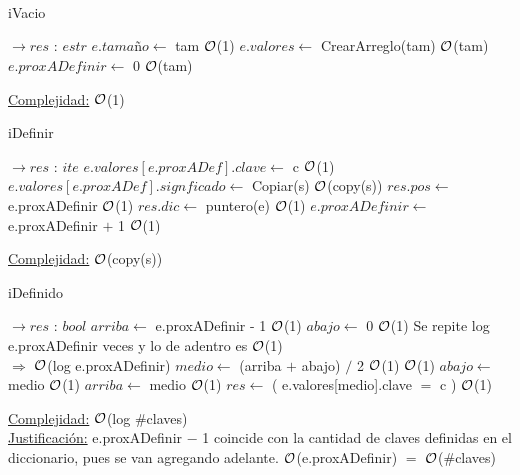 \begin{Representacion}
~

	
~

		
~

	\begin{algorithm}[H]
		\caption{iVacio}
		\begin{algorithmic}
			 $\to res$ : $estr$
				\State $e.tamaño \gets$ tam \Comment $\mathcal{O}$(1)
				\State $e.valores \gets$ CrearArreglo(tam) \Comment $\mathcal{O}$(tam)
				\State $e.proxADefinir \gets$ 0 \Comment $\mathcal{O}$(tam)				
			\EndProcedure
		\end{algorithmic}
		\underline{Complejidad:} $\mathcal{O}$(1)
	\end{algorithm}
	
	\begin{algorithm}[H]
		\caption{iDefinir}
		\begin{algorithmic}
			 $\to res$ : $ite$
				\State $e.valores[e.proxADef].clave \gets$ c \Comment $\mathcal{O}$(1)
				\State $e.valores[e.proxADef].signficado \gets$ Copiar(s) \Comment $\mathcal{O}$(copy(s))
				\State $res.pos \gets$ e.proxADefinir \Comment $\mathcal{O}$(1)
				\State $res.dic \gets$ puntero(e) \Comment $\mathcal{O}$(1)
				\State $e.proxADefinir \gets$ e.proxADefinir $+$ 1 \Comment $\mathcal{O}$(1)
			\EndProcedure
		\end{algorithmic}
		\underline{Complejidad:} $\mathcal{O}$(copy(s))
	\end{algorithm}
	
	\begin{algorithm}[H]
		\caption{iDefinido}
		\begin{algorithmic}
			 $\to res$ : $bool$
				\State $arriba \gets$ e.proxADefinir - 1 \Comment $\mathcal{O}$(1)
				\State $abajo \gets$ 0 \Comment $\mathcal{O}$(1)
				 \Comment Se repite log e.proxADefinir veces y lo de adentro es $\mathcal{O}$(1)\\
				 \hfill $\Rightarrow$ $\mathcal{O}$(log e.proxADefinir)
					\State $	medio \gets$ (arriba $+$ abajo) $/$ 2 \Comment $\mathcal{O}$(1)
					 \Comment $\mathcal{O}$(1)
						\State $abajo \gets$ medio \Comment $\mathcal{O}$(1)
					\Else
						\State $arriba \gets$ medio \Comment $\mathcal{O}$(1)
					\EndIf
				\EndWhile
				\State $res \gets$ ( e.valores[medio].clave $=$ c ) \Comment $\mathcal{O}$(1)
			\EndProcedure
		\end{algorithmic}
		\underline{Complejidad:} $\mathcal{O}$(log $\#$claves)\\
		\underline{Justificación:} e.proxADefinir $-$ 1 coincide con la cantidad de claves definidas en el diccionario, pues se van agregando adelante. $\mathcal{O}$(e.proxADefinir) $=$ $\mathcal{O}$($\#$claves)
	\end{algorithm}
	

\end{Representacion}
